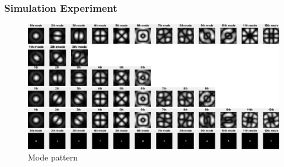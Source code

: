 \documentclass[UTF8]{beamer}
\begin{document}
\begin{frame}


\end{frame}

\begin{frame} \frametitle{Simulation Experiment}
\begin{figure}[H]
\centering
\includegraphics[width=1\linewidth]{../figures/modes_combine}
\caption{Mode pattern
}
\label{fig:modescombine}
\end{figure}


\end{frame}
\end{document}
